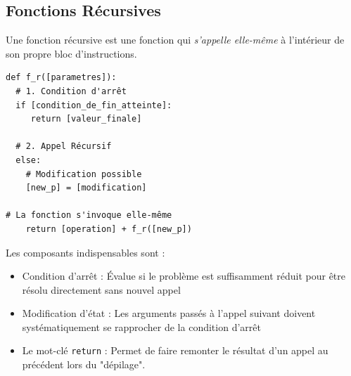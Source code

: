 \subsection{Fonctions Récursives}

Une fonction récursive est une fonction qui \textit{s'appelle elle-même} à l'intérieur de son propre bloc d'instructions.

\begin{verbatim}
def f_r([parametres]):
  # 1. Condition d'arrêt
  if [condition_de_fin_atteinte]:
     return [valeur_finale]
    
  # 2. Appel Récursif 
  else:
    # Modification possible
    [new_p] = [modification]
        
# La fonction s'invoque elle-même
    return [operation] + f_r([new_p])
\end{verbatim}

Les composants indispensables sont :

\begin{itemize}
\item Condition d'arrêt : Évalue si le problème est suffisamment réduit pour être résolu directement sans nouvel appel
\item Modification d'état : Les arguments passés à l'appel suivant doivent systématiquement se rapprocher de la condition d'arrêt
\item Le mot-clé \texttt{return} : Permet de faire remonter le résultat d'un appel au précédent lors du "dépilage".
\end{itemize}